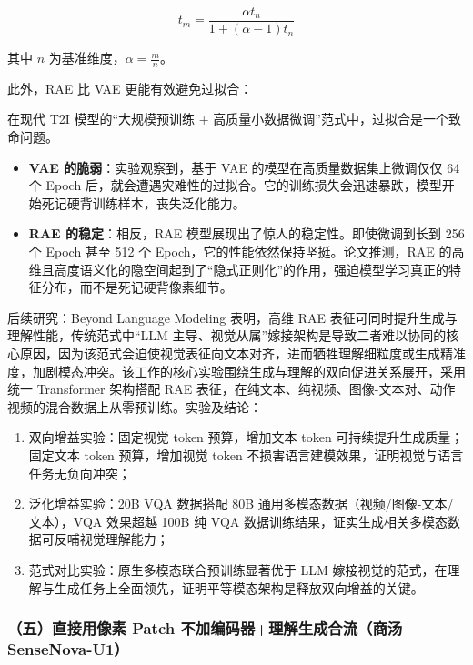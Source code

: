 \[
t_m=\frac{\alpha t_n}{1+(\alpha-1)t_n}
\]

其中 \(n\) 为基准维度，\(\alpha=\frac{m}{n}\)。

此外，RAE 比 VAE 更能有效避免过拟合：

在现代 T2I 模型的``大规模预训练 + 高质量小数据微调''范式中，过拟合是一个致命问题。

\begin{itemize}
\tightlist
\item
  \textbf{VAE 的脆弱}：实验观察到，基于 VAE 的模型在高质量数据集上微调仅仅 64 个 Epoch 后，就会遭遇灾难性的过拟合。它的训练损失会迅速暴跌，模型开始死记硬背训练样本，丧失泛化能力。
\item
  \textbf{RAE 的稳定}：相反，RAE 模型展现出了惊人的稳定性。即使微调到长到 256 个 Epoch 甚至 512 个 Epoch，它的性能依然保持坚挺。论文推测，RAE 的高维且高度语义化的隐空间起到了``隐式正则化''的作用，强迫模型学习真正的特征分布，而不是死记硬背像素细节。
\end{itemize}

后续研究：Beyond Language Modeling 表明，高维 RAE 表征可同时提升生成与理解性能，传统范式中``LLM 主导、视觉从属''嫁接架构是导致二者难以协同的核心原因，因为该范式会迫使视觉表征向文本对齐，进而牺牲理解细粒度或生成精准度，加剧模态冲突。该工作的核心实验围绕生成与理解的双向促进关系展开，采用统一 Transformer 架构搭配 RAE 表征，在纯文本、纯视频、图像-文本对、动作视频的混合数据上从零预训练。实验及结论：

\begin{enumerate}
\def\labelenumi{\arabic{enumi}.}
\tightlist
\item
  双向增益实验：固定视觉 token 预算，增加文本 token 可持续提升生成质量；固定文本 token 预算，增加视觉 token 不损害语言建模效果，证明视觉与语言任务无负向冲突；
\item
  泛化增益实验：20B VQA 数据搭配 80B 通用多模态数据（视频/图像-文本/文本），VQA 效果超越 100B 纯 VQA 数据训练结果，证实生成相关多模态数据可反哺视觉理解能力；
\item
  范式对比实验：原生多模态联合预训练显著优于 LLM 嫁接视觉的范式，在理解与生成任务上全面领先，证明平等模态架构是释放双向增益的关键。
\end{enumerate}

\hypertarget{ux4e94ux76f4ux63a5ux7528ux50cfux7d20-patch-ux4e0dux52a0ux7f16ux7801ux5668ux7406ux89e3ux751fux6210ux5408ux6d41ux5546ux6c64-sensenova-u1}{%
\subsubsection{（五）直接用像素 Patch 不加编码器+理解生成合流（商汤 SenseNova-U1）}\label{ux4e94ux76f4ux63a5ux7528ux50cfux7d20-patch-ux4e0dux52a0ux7f16ux7801ux5668ux7406ux89e3ux751fux6210ux5408ux6d41ux5546ux6c64-sensenova-u1}}

